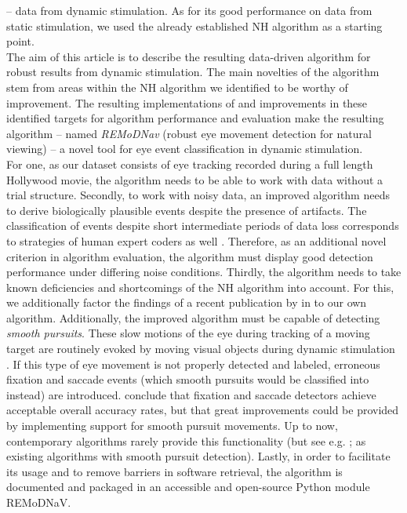     -- data from dynamic stimulation. As for its good performance on data from static stimulation, we used the already
    established NH algorithm as a starting point. \\
    The aim of this article is to describe the resulting data-driven algorithm for robust results from dynamic
    stimulation. The main novelties of the algorithm stem from areas within the NH algorithm we identified to be
    worthy of improvement. The resulting implementations of and improvements in these identified targets for algorithm
    performance and evaluation make the resulting algorithm -- named \textit{REMoDNav} (robust eye movement detection for natural
    viewing) -- a novel tool for eye event classification in dynamic stimulation.\\
    For one, as our dataset consists of eye tracking recorded during a full length Hollywood movie, the algorithm
    needs to be able to work with data without a trial structure.  Secondly, to work with noisy data, an improved
    algorithm needs to derive biologically plausible events despite the presence of artifacts. The classification of
    events despite short intermediate periods of data loss corresponds to strategies of human expert coders as
    well \citep{Hooge2018}. Therefore, as an additional novel criterion in algorithm evaluation, the algorithm must
    display good detection performance under differing noise conditions. Thirdly, the algorithm needs to take known
    deficiencies and shortcomings of the NH algorithm into account. For this, we additionally factor the findings of
    a recent publication by \cite{Friedman2018} in to our own algorithm.
    Additionally, the improved algorithm must be capable of detecting \textit{smooth pursuits}. These slow motions of
    the eye during tracking of a moving target are routinely evoked by moving visual objects during dynamic stimulation
    \citep{carl1987pursuits}. If this type of eye movement is not properly detected and labeled, erroneous fixation and
    saccade events (which smooth pursuits would be classified into instead) are introduced. \cite{Andersson2017}
    conclude that fixation and saccade detectors achieve acceptable overall accuracy rates, but that great improvements
    could be provided by implementing support for smooth pursuit movements. Up to now, contemporary algorithms rarely
    provide this functionality (but see e.g. \cite{LARSSON2015145}; \cite{Komogortsev2013} as existing algorithms with
    smooth pursuit detection).  Lastly, in order to facilitate its usage and to remove barriers in software
    retrieval, the \remodnav algorithm is documented and packaged in an accessible and open-source Python module REMoDNaV. \\

